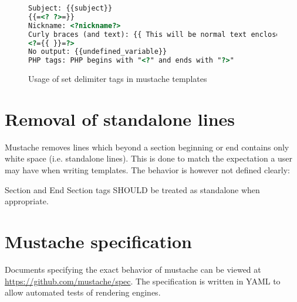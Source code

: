 \documentclass[thesis.tex]{subfiles}
\begin{document}
\begin{figure}
	\centering
	\begin{lstlisting}[language=HTML]
Subject: {{subject}}
{{=<? ?>=}}
Nickname: <?nickname?>
Curly braces (and text): {{ This will be normal text enclosed by curly braces }}
<?={{ }}=?>
No output: {{undefined_variable}}
PHP tags: PHP begins with "<?" and ends with "?>"
	\end{lstlisting}
	\caption{Usage of set delimiter tags in mustache templates}
	\label{fig:set-delim.mustache}
\end{figure}

\section{Removal of standalone lines}
\label{sec:standalone-lines}
Mustache removes lines which beyond a section beginning or end contains
only white space (i.e. standalone lines).
This is done to match the expectation a user may have when writing templates.
The behavior is however not defined clearly:
\begin{citequote}{\cite[sections.yml]{MSTSPEC}}
	Section and End Section tags SHOULD be treated as standalone when
	appropriate. 
\end{citequote}

\section{Mustache specification}
Documents specifying the exact behavior of mustache can be viewed at
\url{https://github.com/mustache/spec}. The specification is written in YAML to
allow automated tests of rendering engines.
\end{document}
